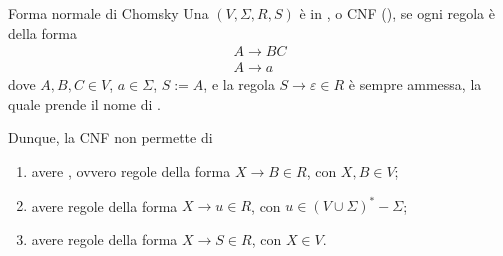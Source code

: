 \documentclass[a4paper, 12pt]{report}
\begin{document}
    \begin{frameddefn}{Forma normale di Chomsky}
        Una \CFG $(V, \Sigma, R, S)$ è in , o CNF (), se ogni regola è della forma $$\left . \begin{array}{c} A \to BC \\ A \to a \end{array} \right .$$ dove $A, B, C \in V$, $a \in \Sigma$, $S := A$, e la regola $S \to \varepsilon \in R$ è sempre ammessa, la quale prende il nome di .

        Dunque, la CNF non permette di

        \begin{enumerate}[label=\roman*), font=\itshape]
            \item avere , ovvero regole della forma $X \to B \in R$, con $X,B \in V$;
            \item avere regole della forma $X \to u \in R$, con $u \in (V \cup \Sigma)^* - \Sigma$;
            \item avere regole della forma $X \to S \in R$, con $X \in V$.
        \end{enumerate}
    \end{frameddefn}
\end{document}
